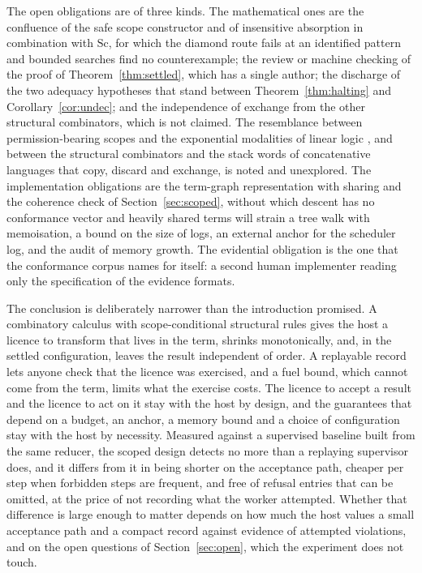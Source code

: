 \documentclass[11pt]{article}
\theoremstyle{definition}
\theoremstyle{remark}
\begin{document}
The open obligations are of three kinds. The mathematical ones are the confluence of the safe scope constructor and of insensitive absorption in combination with $\mathrm{Sc}$, for which the diamond route fails at an identified pattern and bounded searches find no counterexample; the review or machine checking of the proof of Theorem~\ref{thm:settled}, which has a single author; the discharge of the two adequacy hypotheses that stand between Theorem~\ref{thm:halting} and Corollary~\ref{cor:undec}; and the independence of exchange from the other structural combinators, which is not claimed. The resemblance between permission-bearing scopes and the exponential modalities of linear logic \citep{girard1987}, and between the structural combinators and the stack words of concatenative languages that copy, discard and exchange, is noted and unexplored. The implementation obligations are the term-graph representation with sharing and the coherence check of Section~\ref{sec:scoped}, without which descent has no conformance vector and heavily shared terms will strain a tree walk with memoisation, a bound on the size of logs, an external anchor for the scheduler log, and the audit of memory growth. The evidential obligation is the one that the conformance corpus names for itself: a second human implementer reading only the specification of the evidence formats.

The conclusion is deliberately narrower than the introduction promised. A combinatory calculus with scope-conditional structural rules gives the host a licence to transform that lives in the term, shrinks monotonically, and, in the settled configuration, leaves the result independent of order. A replayable record lets anyone check that the licence was exercised, and a fuel bound, which cannot come from the term, limits what the exercise costs. The licence to accept a result and the licence to act on it stay with the host by design, and the guarantees that depend on a budget, an anchor, a memory bound and a choice of configuration stay with the host by necessity. Measured against a supervised baseline built from the same reducer, the scoped design detects no more than a replaying supervisor does, and it differs from it in being shorter on the acceptance path, cheaper per step when forbidden steps are frequent, and free of refusal entries that can be omitted, at the price of not recording what the worker attempted. Whether that difference is large enough to matter depends on how much the host values a small acceptance path and a compact record against evidence of attempted violations, and on the open questions of Section~\ref{sec:open}, which the experiment does not touch.
\end{document}
